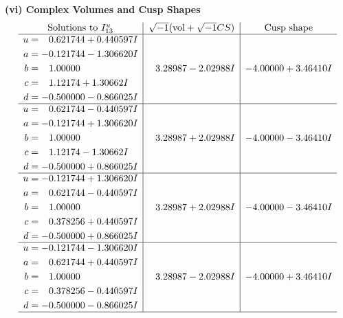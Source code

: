\documentclass[1p]{elsarticle_modified}
\theoremstyle{definition}
\newcommand{\I}{\sqrt{-1}}
\begin{document}
\newpage\flushleft \textbf{(vi) Complex Volumes and Cusp Shapes}
$$\begin{array}{c|c|c}  
\text{Solutions to }I^u_{13}& \I (\text{vol} + \sqrt{-1}CS) & \text{Cusp shape}\\
 \hline 
\begin{aligned}
u &= \phantom{-}0.621744 + 0.440597 I \\
a &= -0.121744 - 1.306620 I \\
b &= \phantom{-}1.00000\phantom{ +0.000000I} \\
c &= \phantom{-}1.12174 + 1.30662 I \\
d &= -0.500000 - 0.866025 I\end{aligned}
 & \phantom{-}3.28987 - 2.02988 I & -4.00000 + 3.46410 I \\ \hline\begin{aligned}
u &= \phantom{-}0.621744 - 0.440597 I \\
a &= -0.121744 + 1.306620 I \\
b &= \phantom{-}1.00000\phantom{ +0.000000I} \\
c &= \phantom{-}1.12174 - 1.30662 I \\
d &= -0.500000 + 0.866025 I\end{aligned}
 & \phantom{-}3.28987 + 2.02988 I & -4.00000 - 3.46410 I \\ \hline\begin{aligned}
u &= -0.121744 + 1.306620 I \\
a &= \phantom{-}0.621744 - 0.440597 I \\
b &= \phantom{-}1.00000\phantom{ +0.000000I} \\
c &= \phantom{-}0.378256 + 0.440597 I \\
d &= -0.500000 + 0.866025 I\end{aligned}
 & \phantom{-}3.28987 + 2.02988 I & -4.00000 - 3.46410 I \\ \hline\begin{aligned}
u &= -0.121744 - 1.306620 I \\
a &= \phantom{-}0.621744 + 0.440597 I \\
b &= \phantom{-}1.00000\phantom{ +0.000000I} \\
c &= \phantom{-}0.378256 - 0.440597 I \\
d &= -0.500000 - 0.866025 I\end{aligned}
 & \phantom{-}3.28987 - 2.02988 I & -4.00000 + 3.46410 I\\
 \hline 
 \end{array}$$\newpage\newpage\renewcommand{\arraystretch}{1}
\end{document}
